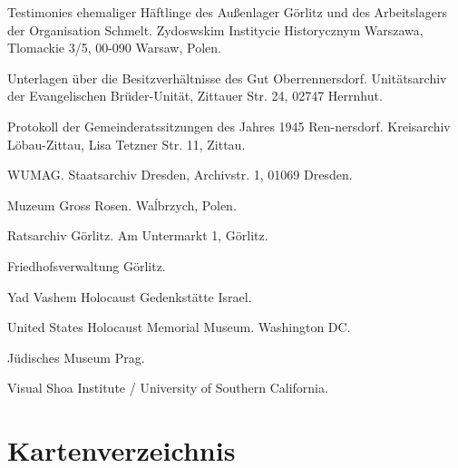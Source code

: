 \documentclass[a4paper,12pt,ngerman,
]{nisebook}
\begin{document}
\begin{thebibliography}{Archivalien}

\begin{footnotesize}

 {Testimonies ehemaliger Häftlinge des Außenlager Görlitz und des Arbeitslagers der Organisation Schmelt. Zydoswskim Institycie Historycznym Warszawa, Tlomackie 3/5, 00-090 Warsaw, Polen.}

 {Unterlagen über die Besitzverhältnisse des Gut Oberrennersdorf. Unitätsarchiv der Evangelischen Brüder-Unität, Zittauer Str. 24, 02747 Herrnhut.}

 
 {Protokoll der Gemeinderatssitzungen des Jahres 1945 Ren-nersdorf. Kreisarchiv Löbau-Zittau, Lisa Tetzner Str. 11, Zittau.}

 {WUMAG. Staatsarchiv Dresden, Archivstr. 1, 01069 Dresden.}
																					
 {Muzeum Gross Rosen. Wa\'lbrzych, Polen.}						

 {Ratsarchiv Görlitz. Am Untermarkt 1, Görlitz.}

 {Friedhofsverwaltung Görlitz.}

 {Yad Vashem Holocaust Gedenkstätte Israel.}

 {United States Holocaust Memorial Museum. Washington DC.}

 {Jüdisches Museum Prag.}

 {Visual Shoa Institute / University of Southern California.}

\end{footnotesize}
\end{thebibliography}






\section*{Kartenverzeichnis}
\listofmymaps
\end{document}
